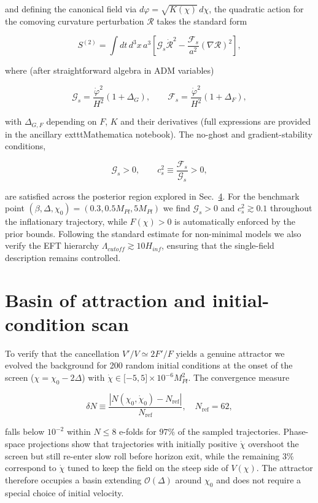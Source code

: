 \documentclass[
]{article}
\begin{document}
and defining the canonical field via
\(d\varphi = \sqrt{K(\chi)}\, d\chi\), the quadratic action for the
comoving curvature perturbation \(\mathcal{R}\) takes the standard form

\[
S^{(2)} = \int dt\, d^{3}x\, a^{3}\left\lbrack \mathcal{G}_{s}{\dot{\mathcal{R}}}^{2} - \frac{\mathcal{F}_{s}}{a^{2}}(\nabla\mathcal{R})^{2} \right\rbrack,
\]

where (after straightforward algebra in ADM variables)

\[
\mathcal{G}_{s} = \frac{{\dot{\varphi}}^{2}}{H^{2}}\left( 1 + \Delta_{G} \right),\quad\quad\mathcal{F}_{s} = \frac{{\dot{\varphi}}^{2}}{H^{2}}\left( 1 + \Delta_{F} \right),
\]

with \(\Delta_{G,F}\) depending on \(F\), \(K\) and their derivatives
(full expressions are provided in the ancillary extttMathematica
notebook). The no-ghost and gradient-stability conditions,

\[
\mathcal{G}_{s} > 0,\quad\quad c_{s}^{2} \equiv \frac{\mathcal{F}_{s}}{\mathcal{G}_{s}} > 0,
\]

are satisfied across the posterior region explored in
Sec.~\hyperref[sec:inflationary-observables]{4}. For the benchmark point
\((\beta,\Delta,\chi_{0}) = (0.3,0.5M_{Pl},5M_{Pl})\) we find
\(\mathcal{G}_{s} > 0\) and \(c_{s}^{2} \gtrsim 0.1\) throughout the
inflationary trajectory, while \(F(\chi) > 0\) is automatically enforced
by the prior bounds. Following the standard estimate for non-minimal
models we also verify the EFT hierarchy
\(\Lambda_{cutoff} \gtrsim 10H_{inf}\), ensuring that the single-field
description remains controlled.

\section{Basin of attraction and initial-condition
scan}\label{basin-of-attraction-and-initial-condition-scan}

To verify that the cancellation \(V'/V \simeq 2F'/F\) yields a genuine
attractor we evolved the background for 200 random initial conditions at
the onset of the screen (\(\chi = \chi_{0} - 2\Delta\)) with
\(\dot{\chi} \in \lbrack - 5,5 \rbrack \times 10^{- 6}M_{Pl}^{2}\). The
convergence measure

\[
\delta N \equiv \frac{|N(\chi_{0},\dot{\chi}_{0}) - N_{\text{ref}}|}{N_{\text{ref}}},\quad N_{\text{ref}} = 62,
\]

falls below \(10^{- 2}\) within \(N \leq 8\) e-folds for \(97\%\) of the
sampled trajectories. Phase-space projections show that trajectories
with initially positive \(\dot{\chi}\) overshoot the screen but still
re-enter slow roll before horizon exit, while the remaining \(3\%\)
correspond to \(\dot{\chi}\) tuned to keep the field on the steep side
of \(V(\chi)\). The attractor therefore occupies a basin extending
\(\mathcal{O}(\Delta)\) around \(\chi_{0}\) and does not require a
special choice of initial velocity.
\end{document}
